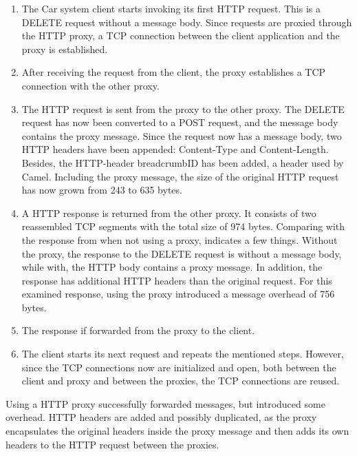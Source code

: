 \begin{enumerate}

    \item The Car system client starts invoking its first HTTP request. This is
    a DELETE request without a message body. Since requests are proxied through
    the HTTP proxy, a TCP connection between the client application and the
    proxy is established.

    \item After receiving the request from the client, the proxy establishes a
    TCP connection with the other proxy.

    \item The HTTP request is sent from the proxy to the other proxy. The DELETE
    request has now been converted to a POST request, and the message body
    contains the proxy message. Since the request now has a message body, two
    HTTP headers have been appended: Content-Type and Content-Length. Besides,
    the HTTP-header breadcrumbID has been added, a header used by Camel.
    Including the proxy message, the size of the original HTTP request has now
    grown from 243 to 635 bytes.

	\item A HTTP response is returned from the other proxy. It consists of two
	reassembled TCP segments with the total size of 974  bytes. Comparing with the
	response from when not using a proxy, indicates a few things. Without the
	proxy, the response to the DELETE request is without a message body, while
	with, the HTTP body contains a proxy message. In addition, the response has
	additional HTTP headers than the original request. For this examined response,
	using the proxy introduced a message overhead of 756 bytes.

    \item The response if forwarded from the proxy to the client.

    \item The client starts its next request and repeats the mentioned steps.
    However, since the TCP connections now are initialized and open, both
    between the client and proxy and between the proxies, the TCP connections
    are reused.


  \end{enumerate}

Using a HTTP proxy successfully forwarded messages, but introduced some
overhead. HTTP headers are added and possibly duplicated, as the proxy
encapsulates the original headers inside the proxy message and then adds
its own headers to the HTTP request between the proxies.



